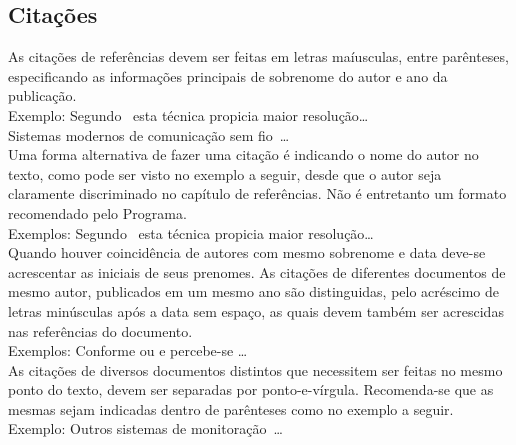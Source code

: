 \documentclass[repeatfields,xlists,xpacks,oneside,yearsonly]{ufrgscca}
\begin{document}
\begin{appendix}
        \section{Citações}

        As citações de referências devem ser feitas em letras maíusculas, entre
        parênteses, especificando as informações principais de sobrenome do autor e
        ano da publicação.\\

        Exemplo: Segundo~\cite{Brito:IEE-1994} esta técnica propicia maior
        resolução\ldots\\

        Sistemas modernos de comunicação sem fio~\cite{Bilstrup:FCS-239}\ldots\\

        Uma forma alternativa de fazer uma citação é indicando o nome do autor no
        texto, como pode ser visto no exemplo a seguir, desde que o autor seja
        claramente discriminado no capítulo de referências. Não é entretanto um
        formato recomendado pelo Programa.\\

        Exemplos: Segundo~\textcite{Brito:IEE-1994} esta técnica propicia maior
        resolução\ldots\\

        Quando houver coincidência de autores com mesmo sobrenome e data deve-se
        acrescentar as iniciais de seus prenomes. As citações de diferentes
        documentos de mesmo autor, publicados em um mesmo ano são distinguidas, pelo
        acréscimo de letras minúsculas após a data sem espaço, as quais devem também
        ser acrescidas nas referências do documento.\\

        Exemplos: Conforme \cite{Pereira:OORT1999-133} ou \cite{Pereira:OORT1999-155} e
        \cite{Pereira:RTP1999-9} percebe-se \ldots\\

        As citações de diversos documentos distintos que necessitem ser feitas no
        mesmo ponto do texto, devem ser separadas por ponto-e-vírgula. Recomenda-se
        que as mesmas sejam indicadas dentro de parênteses como no exemplo a
        seguir.\\

        Exemplo: Outros sistemas de
        monitoração~\cite{Baturone:DCIS1996-231,Cota:TIM-49-2}\ldots\\


\end{appendix}
\end{document}
